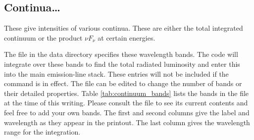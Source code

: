 \subsection{Continua\dots}

These give intensities of various continua.  These are either the total
integrated continuum or the product $\nu F_\nu$ at certain energies.

The file  in the data directory
specifies these
wavelength bands.
The code will integrate over these bands to find the
total radiated luminosity and enter this into the main emission-line stack.
These entries will not be included if the  command is in effect.
The  file can be edited to change the number of bands
or their detailed properties.
Table \ref{tab:continuum_bands} lists the bands in the file at the
time of this writing.
Please consult the file to see its current contents
and feel free to add your own bands.
The first and second columns give
the label and wavelength as they appear in the printout.
The last column
gives the wavelength range for the integration.

